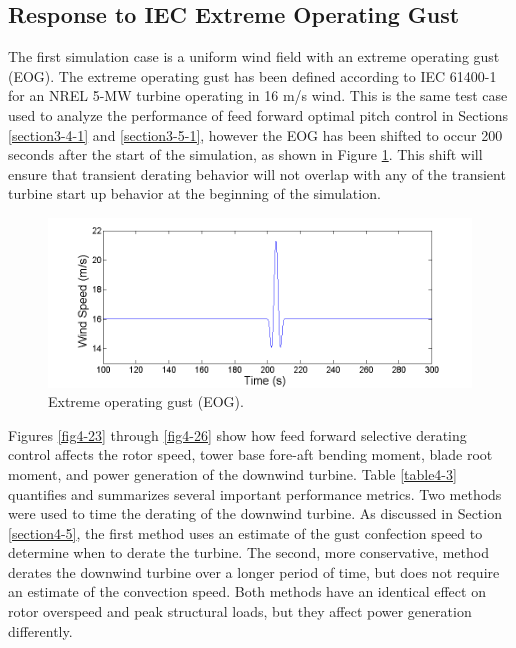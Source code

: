 \subsection{Response to IEC Extreme Operating Gust} \label{section4-6-1}

The first simulation case is a uniform wind field with an extreme operating gust (EOG). The extreme operating gust has been defined according to IEC 61400-1 \cite{IEC2005} for an NREL 5-MW turbine operating in 16 m/s wind. This is the same test case used to analyze the performance of feed forward optimal pitch control in Sections \ref{section3-4-1} and \ref{section3-5-1}, however the EOG has been shifted to occur 200 seconds after the start of the simulation, as shown in Figure \ref{fig4-22}. This shift will ensure that transient derating behavior will not overlap with any of the transient turbine start up  behavior at the beginning of the simulation.

\begin{figure}[htb]
	\centering
		\includegraphics[width = \linewidth]{Figures/ch4Figures/fig4-22.png}
		
	\caption{Extreme operating gust (EOG).}
	\label{fig4-22}
\end{figure}

Figures \ref{fig4-23} through \ref{fig4-26} show how feed forward selective derating control affects the rotor speed, tower base fore-aft bending moment, blade root moment, and power generation of the downwind turbine. Table \ref{table4-3} quantifies and summarizes several important performance metrics. Two methods were used to time the derating of the downwind turbine. As discussed in Section \ref{section4-5}, the first method uses an estimate of the gust confection speed to determine when to derate the turbine. The second, more conservative,  method derates the downwind turbine over a longer period of time, but does not require an estimate of the convection speed. Both methods have an identical effect on rotor overspeed and peak structural loads, but they affect power generation differently. 

